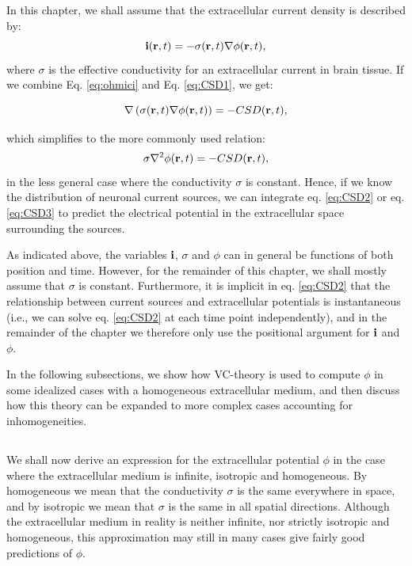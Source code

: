 In this chapter, we shall assume that the extracellular current density is described by:
\begin{equation}
{\bf i}({\bf r}, t) = - \sigma({\bf r}, t) \nabla \phi({\bf r}, t),
\label{eq:ohmici}
\end{equation}
where $\sigma$ is the effective conductivity for an extracellular current in brain tissue. If we combine Eq. \ref{eq:ohmici} and Eq. \ref{eq:CSD1}, we get:

\begin{equation}
\nabla \left( \sigma({\bf r}, t) \nabla \phi({\bf r}, t) \right) = - CSD({\bf r}, t),
\label{eq:CSD2}
\end{equation}

which simplifies to the more commonly used relation:
\begin{equation}
\sigma \nabla^2\phi({\bf r}, t) = - CSD({\bf r}, t),
\label{eq:CSD3}
\end{equation}
in the less general case where the conductivity $\sigma$ is constant. Hence, if we know the distribution of neuronal current sources, we can integrate eq. \ref{eq:CSD2} or eq. \ref{eq:CSD3} to predict the electrical potential in the extracellular space surrounding the sources. 

As indicated above, the variables ${\bf i}$, $\sigma$ and $\phi$ can in general be functions of both position and time. However, for the remainder of this chapter, we shall mostly assume that $\sigma$ is constant. Furthermore, it is implicit in eq. \ref{eq:CSD2} that the relationship between current sources and extracellular potentials is instantaneous (i.e., we can solve eq.  \ref{eq:CSD2} at each time point independently), and in the remainder of the chapter we therefore only use the positional argument for ${\bf i}$ and $\phi$. 

In the following subsections, we show how VC-theory is used to compute $\phi$ in some idealized cases with a homogeneous extracellular medium, and then discuss how this theory can be expanded to more complex cases accounting for inhomogeneities. 


\subsection{}
\label{sec:isohomo}
We shall now derive an expression for the extracellular potential $\phi$ in the case where the extracellular medium is infinite, isotropic and homogeneous. By homogeneous we mean that the conductivity $\sigma$ is the same everywhere in space, and by isotropic we mean that $\sigma$ is the same in all spatial directions. Although the extracellular medium in reality is neither infinite, nor strictly isotropic and homogeneous, this approximation may still in many cases give fairly good predictions of $\phi$.


